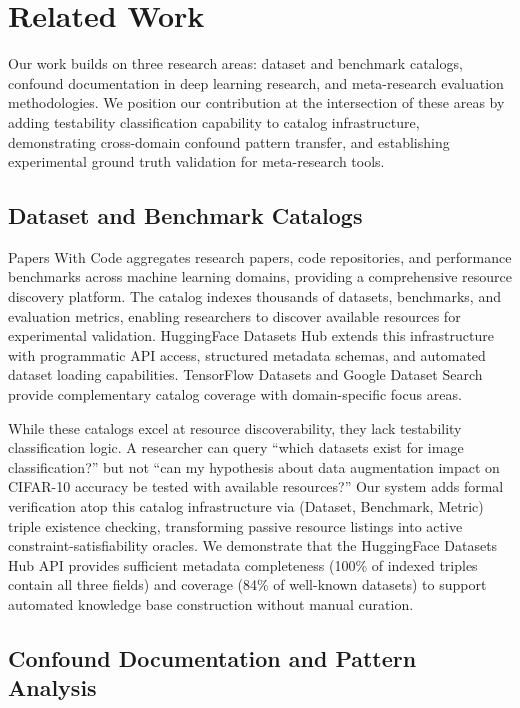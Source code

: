 \section{Related Work}

Our work builds on three research areas: dataset and benchmark catalogs, confound documentation in deep learning research, and meta-research evaluation methodologies. We position our contribution at the intersection of these areas by adding testability classification capability to catalog infrastructure, demonstrating cross-domain confound pattern transfer, and establishing experimental ground truth validation for meta-research tools.

\subsection{Dataset and Benchmark Catalogs}

Papers With Code \cite{bouthillier2021} aggregates research papers, code repositories, and performance benchmarks across machine learning domains, providing a comprehensive resource discovery platform. The catalog indexes thousands of datasets, benchmarks, and evaluation metrics, enabling researchers to discover available resources for experimental validation. HuggingFace Datasets Hub extends this infrastructure with programmatic API access, structured metadata schemas, and automated dataset loading capabilities. TensorFlow Datasets and Google Dataset Search provide complementary catalog coverage with domain-specific focus areas.

While these catalogs excel at resource discoverability, they lack testability classification logic. A researcher can query ``which datasets exist for image classification?'' but not ``can my hypothesis about data augmentation impact on CIFAR-10 accuracy be tested with available resources?'' Our system adds formal verification atop this catalog infrastructure via (Dataset, Benchmark, Metric) triple existence checking, transforming passive resource listings into active constraint-satisfiability oracles. We demonstrate that the HuggingFace Datasets Hub API provides sufficient metadata completeness (100\% of indexed triples contain all three fields) and coverage (84\% of well-known datasets) to support automated knowledge base construction without manual curation.

\subsection{Confound Documentation and Pattern Analysis}

